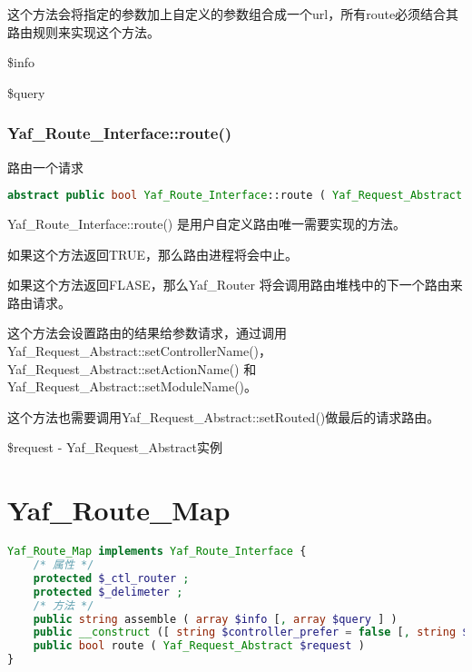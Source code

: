 这个方法会将指定的参数加上自定义的参数组合成一个url，所有route必须结合其路由规则来实现这个方法。

\begin{compactitem}
\item \$info
\item \$query
\end{compactitem}




\subsection{Yaf\_Route\_Interface::route()}

路由一个请求


\begin{lstlisting}[language=PHP]
abstract public bool Yaf_Route_Interface::route ( Yaf_Request_Abstract $request )
\end{lstlisting}


Yaf\_Route\_Interface::route() 是用户自定义路由唯一需要实现的方法。

\begin{compactitem}
\item 如果这个方法返回TRUE，那么路由进程将会中止。
\item 如果这个方法返回FLASE，那么Yaf\_Router 将会调用路由堆栈中的下一个路由来路由请求。
\end{compactitem}

这个方法会设置路由的结果给参数请求，通过调用Yaf\_Request\_Abstract::setControllerName()，Yaf\_Request\_Abstract::setActionName() 和 Yaf\_Request\_Abstract::setModuleName()。

这个方法也需要调用Yaf\_Request\_Abstract::setRouted()做最后的请求路由。

\begin{compactitem}
\item \$request - Yaf\_Request\_Abstract实例
\end{compactitem}


\chapter{Yaf\_Route\_Map}


\begin{lstlisting}[language=PHP]
Yaf_Route_Map implements Yaf_Route_Interface {
    /* 属性 */
    protected $_ctl_router ;
    protected $_delimeter ;
    /* 方法 */
    public string assemble ( array $info [, array $query ] )
    public __construct ([ string $controller_prefer = false [, string $delimiter = '' ]] )
    public bool route ( Yaf_Request_Abstract $request )
}
\end{lstlisting}

